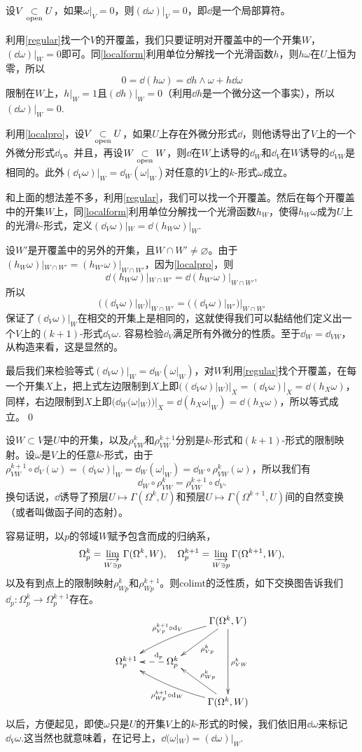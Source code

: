 \para \label{localpro}设$V\underset{\mathrm{open}}{\subset} U$，如果$\omega|_V=0$，则$(\dd \omega)|_V=0$，即$\dd$是一个局部算符。

利用\eqref{regular}找一个$V$的开覆盖，我们只要证明对开覆盖中的一个开集$W$，$(\dd \omega)|_{W}=0$即可。同\eqref{localform}利用单位分解找一个光滑函数$h$，则$h\omega$在$U$上恒为零，所以
\[
	0=\dd (h\omega)=\dd h \wedge \omega +h\dd \omega
\]
限制在$W$上，$h|_{W}=1$且$(\dd h)|_{W}=0$（利用$\dd h$是一个微分这一个事实），所以$(\dd \omega)|_{W}=0$.

\pro \label{localdef}利用\eqref{localpro}，设$V\underset{\mathrm{open}}{\subset} U$，如果$U$上存在外微分形式$\dd$，则他诱导出了$V$上的一个外微分形式$\dd_V$。并且，再设$W\underset{\mathrm{open}}{\subset} W$，则$\dd$在$W$上诱导的$\dd_W$和$\dd_V$在$W$诱导的$\dd_{VW}$是相同的。此外$(\dd_V \omega)|_W=\dd_W (\omega|_W)$对任意的$V$上的$k$-形式$\omega$成立。

\proof 和上面的想法差不多，利用\eqref{regular}，我们可以找一个开覆盖。然后在每个开覆盖中的开集$W$上，同\eqref{localform}利用单位分解找一个光滑函数$h_W$，使得$h_W\omega$成为$U$上的光滑$k$-形式，定义$(\dd_V \omega)|_{W}=\dd (h_W\omega)|_{W}$.

设$W'$是开覆盖中的另外的开集，且$W\cap W'\neq \varnothing$。由于$(h_W\omega)|_{W\cap W'}=(h_{W'}\omega)|_{W\cap W'}$，因为\eqref{localpro}，则
\[
	\dd (h_W\omega)|_{W\cap W'}=\dd (h_{W'}\omega)|_{W\cap W'},
\]
所以
\[
	((\dd_V \omega)|_{W})|_{W\cap W'}=((\dd_V \omega)|_{W'})|_{W\cap W'}
\]
保证了$(\dd_V \omega)|_W$在相交的开集上是相同的，这就使得我们可以黏结他们定义出一个$V$上的$(k+1)$-形式$\dd_V \omega$. 容易检验$\dd_V$满足所有外微分的性质。至于$\dd_W=\dd_{VW}$，从构造来看，这是显然的。

最后我们来检验等式$(\dd_V \omega)|_W=\dd_W (\omega|_W)$，对$W$利用\eqref{regular}找个开覆盖，在每一个开集$X$上，把上式左边限制到$X$上即$((\dd_V \omega)|_W)|_X=(\dd_V \omega)|_X=\dd(h_X\omega)$，同样，右边限制到$X$上即$(\dd_W (\omega|_W))|_X=\dd(h_X\omega|_W)=\dd(h_X\omega)$，所以等式成立。\qed

\para 设$W\subset V$是$U$中的开集，以及$\rho^k_{VW}$和$\rho^{k+1}_{VW}$分别是$k$-形式和$(k+1)$-形式的限制映射。设$\omega$是$V$上的任意$k$-形式，由于$\rho^{k+1}_{VW}\circ \dd_V (\omega)=(\dd_V \omega)|_W=\dd_W (\omega|_W)=\dd_W \circ \rho^k_{VW}(\omega)$，所以我们有
\[
\dd_W\circ \rho^k_{VW}=\rho^{k+1}_{VW}\circ \dd_V.
\]
换句话说，$\dd$诱导了预层$U\mapsto \Gamma(\Omega^k,U)$和预层$U\mapsto \Gamma(\Omega^{k+1},U)$间的自然变换（或者叫做函子间的态射）。

\para 容易证明，以$p$的邻域$W$赋予包含而成的归纳系，
\[
	\Omega_p^k=\varinjlim_{W\ni p}\Gamma(\Omega^k,W),\quad \Omega_p^{k+1}=\varinjlim_{W\ni p}\Gamma(\Omega^{k+1},W),
\]
以及有到点上的限制映射$\rho^k_{Wp}$和$\rho^{k+1}_{Wp}$。则colimt的泛性质，如下交换图告诉我们$\dd_p:\Omega_p^k\to \Omega_p^{k+1}$存在。
\[
	\xymatrix{
	&&\ar[dl]^{\rho^k_{Vp}}\Gamma(\Omega^k,V)\ar[dd]^{\rho^k_{VW}}\ar@/_/[lld]_{\rho^{k+1}_{Vp}\circ \dd_V} \\
	\Omega_p^{k+1}&\ar@{-->}[l]_(0.3){\dd_p}\Omega_p^{k}&\\
	&&\ar[ul]_{\rho^k_{Wp}}\Gamma(\Omega^k,W)\ar@/^/[llu]^{\rho^{k+1}_{Wp}\circ \dd_W}
	}
\]
以后，方便起见，即使$\omega$只是$U$的开集$V$上的$k$-形式的时候，我们依旧用$\dd \omega$来标记$\dd_V \omega$.这当然也就意味着，在记号上，$\dd(\omega|_W)=(\dd\omega)|_W$.

